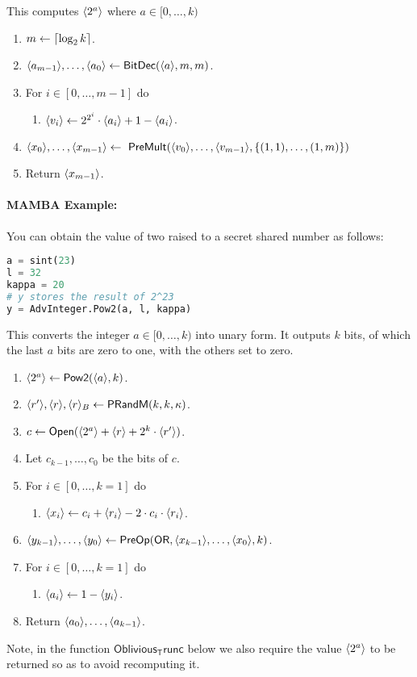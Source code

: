 This computes $\langle 2^a \rangle$ where $a \in [0,\ldots,k)$
\begin{enumerate}
\item $m \leftarrow {\lceil \log_2 k \rceil}$.
\item $\langle a_{m-1} \rangle,\ldots,\langle a_0 \rangle \leftarrow \mathsf{BitDec}(\langle a \rangle,m,m)$.
\item For $i\in [0,\ldots,m-1]$ do
\begin{enumerate}
  \item $\langle v_i \rangle \leftarrow 2^{2^i} \cdot \langle a_i \rangle+1-\langle a_i \rangle$.
\end{enumerate}
\item $\langle x_0 \rangle,\ldots,\langle x_{m-1} \rangle
        \leftarrow \ \mathsf{PreMult}(\langle v_0 \rangle,\ldots,\langle v_{m-1} \rangle, \{(1,1),\ldots,(1,m)\})$
\item Return $\langle x_{m-1} \rangle$.
\end{enumerate}
\paragraph{MAMBA Example:} You can obtain the value of two raised to a secret shared number as follows:
\begin{lstlisting}[language={python}]
a = sint(23)
l = 32
kappa = 20
# y stores the result of 2^23
y = AdvInteger.Pow2(a, l, kappa)
\end{lstlisting}

This converts the integer $a \in [0,\ldots,k)$ into unary form.
It outputs $k$ bits, of which the last $a$ bits are zero to one,
with the others set to zero.
\begin{enumerate}
\item $\langle 2^a \rangle \leftarrow \mathsf{Pow2}(\langle a \rangle,k)$.
\item $\langle r' \rangle, \langle r \rangle, \langle r \rangle_B \leftarrow \mathsf{PRandM}(k,k,\kappa)$.
\item $c \leftarrow {\mathsf{Open}}(\langle 2^a \rangle+\langle r \rangle+2^k \cdot \langle r' \rangle)$.
\item Let $c_{k-1},\ldots,c_0$ be the bits of $c$.
\item For $i \in [0,\ldots,k=1]$ do
\begin{enumerate}
        \item $\langle x_i \rangle \leftarrow c_i+\langle r_i \rangle-2 \cdot c_i \cdot \langle r_i \rangle$.
\end{enumerate}
\item $\langle y_{k-1} \rangle,\ldots,\langle y_0 \rangle \leftarrow \mathsf{PreOp}(\mathsf{OR},\langle x_{k-1} \rangle,\ldots,\langle x_0 \rangle,k)$.
\item For $i \in [0,\ldots,k=1]$ do
\begin{enumerate}
        \item $\langle a_i \rangle \leftarrow 1-\langle y_i \rangle$.
\end{enumerate}
\item Return $\langle a_0 \rangle,\ldots,\langle a_{k-1} \rangle$.
\end{enumerate}
Note, in the function $\mathsf{Oblivious_Trunc}$ below we also require the
value $\langle 2^a \rangle$ to be returned so as to avoid recomputing it.

